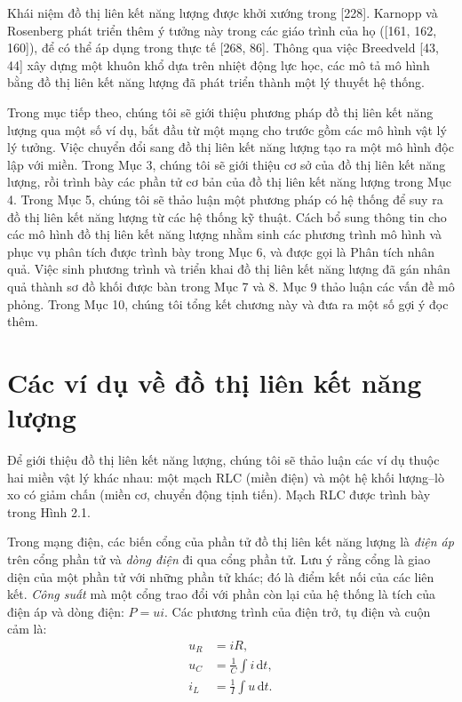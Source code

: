 Khái niệm đồ thị liên kết năng lượng được khởi xướng trong [228]. Karnopp và Rosenberg phát triển thêm ý tưởng này trong các giáo trình của họ ([161, 162, 160]), để có thể áp dụng trong thực tế [268, 86]. Thông qua việc Breedveld [43, 44] xây dựng một khuôn khổ dựa trên nhiệt động lực học, các mô tả mô hình bằng đồ thị liên kết năng lượng đã phát triển thành một lý thuyết hệ thống.

Trong mục tiếp theo, chúng tôi sẽ giới thiệu phương pháp đồ thị liên kết năng lượng qua một số ví dụ, bắt đầu từ một mạng cho trước gồm các mô hình vật lý lý tưởng. Việc chuyển đổi sang đồ thị liên kết năng lượng tạo ra một mô hình độc lập với miền. Trong Mục 3, chúng tôi sẽ giới thiệu cơ sở của đồ thị liên kết năng lượng, rồi trình bày các phần tử cơ bản của đồ thị liên kết năng lượng trong Mục 4. Trong Mục 5, chúng tôi sẽ thảo luận một phương pháp có hệ thống để suy ra đồ thị liên kết năng lượng từ các hệ thống kỹ thuật. Cách bổ sung thông tin cho các mô hình đồ thị liên kết năng lượng nhằm sinh các phương trình mô hình và phục vụ phân tích được trình bày trong Mục 6, và được gọi là Phân tích nhân quả. Việc sinh phương trình và triển khai đồ thị liên kết năng lượng đã gán nhân quả thành sơ đồ khối được bàn trong Mục 7 và 8. Mục 9 thảo luận các vấn đề mô phỏng. Trong Mục 10, chúng tôi tổng kết chương này và đưa ra một số gợi ý đọc thêm.

\section{Các ví dụ về đồ thị liên kết năng lượng}
Để giới thiệu đồ thị liên kết năng lượng, chúng tôi sẽ thảo luận các ví dụ thuộc hai miền vật lý khác nhau: một mạch RLC (miền điện) và một hệ khối lượng--lò xo có giảm chấn (miền cơ, chuyển động tịnh tiến). Mạch RLC được trình bày trong Hình 2.1.

Trong mạng điện, các biến cổng của phần tử đồ thị liên kết năng lượng là \emph{điện áp} trên cổng phần tử và \emph{dòng điện} đi qua cổng phần tử. Lưu ý rằng cổng là giao diện của một phần tử với những phần tử khác; đó là điểm kết nối của các liên kết. \emph{Công suất} mà một cổng trao đổi với phần còn lại của hệ thống là tích của điện áp và dòng điện: $P=ui$. Các phương trình của điện trở, tụ điện và cuộn cảm là:
\[
\begin{aligned}
u_R &= iR,\\
u_C &= \frac{1}{C}\int i\,\mathrm{d}t,\\
i_L &= \frac{1}{I}\int u\,\mathrm{d}t.
\end{aligned}
\]

